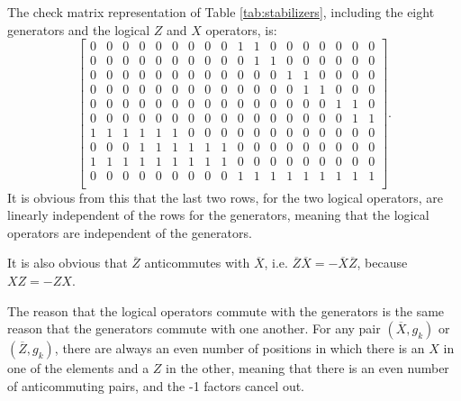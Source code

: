 \documentclass[12pt]{extarticle}
\begin{document}

The check matrix representation of Table \ref{tab:stabilizers}, including the eight generators and the logical $Z$ and $X$ operators, is:
\[
\left[
\begin{array}{ccccccccc|ccccccccc}
    0 & 0 & 0 & 0 & 0 & 0 & 0 & 0 & 0  &  1 & 1 & 0 & 0 & 0 & 0 & 0 & 0 & 0 \\
    0 & 0 & 0 & 0 & 0 & 0 & 0 & 0 & 0  &  0 & 1 & 1 & 0 & 0 & 0 & 0 & 0 & 0 \\
    0 & 0 & 0 & 0 & 0 & 0 & 0 & 0 & 0  &  0 & 0 & 0 & 1 & 1 & 0 & 0 & 0 & 0 \\
    0 & 0 & 0 & 0 & 0 & 0 & 0 & 0 & 0  &  0 & 0 & 0 & 0 & 1 & 1 & 0 & 0 & 0 \\
    0 & 0 & 0 & 0 & 0 & 0 & 0 & 0 & 0  &  0 & 0 & 0 & 0 & 0 & 0 & 1 & 1 & 0 \\
    0 & 0 & 0 & 0 & 0 & 0 & 0 & 0 & 0  &  0 & 0 & 0 & 0 & 0 & 0 & 0 & 1 & 1 \\
    1 & 1 & 1 & 1 & 1 & 1 & 0 & 0 & 0  &  0 & 0 & 0 & 0 & 0 & 0 & 0 & 0 & 0 \\
    0 & 0 & 0 & 1 & 1 & 1 & 1 & 1 & 1  &  0 & 0 & 0 & 0 & 0 & 0 & 0 & 0 & 0 \\
    1 & 1 & 1 & 1 & 1 & 1 & 1 & 1 & 1  &  0 & 0 & 0 & 0 & 0 & 0 & 0 & 0 & 0 \\
    0 & 0 & 0 & 0 & 0 & 0 & 0 & 0 & 0  &  1 & 1 & 1 & 1 & 1 & 1 & 1 & 1 & 1 \\
\end{array}
\right].
\]
It is obvious from this that the last two rows, for the two logical operators, are linearly independent of the rows for the generators,
meaning that the logical operators are independent of the generators.

It is also obvious that $\overline{Z}$ anticommutes with $\overline{X}$, i.e. $\overline{Z}\overline{X} = -\overline{X}\overline{Z}$,
because $XZ = -ZX$.

The reason that the logical operators commute with the generators is the same reason that the generators commute with one another.
For any pair $(\overline{X},g_k)$ or $(\overline{Z},g_k)$, there are always an even number of positions in which there is an $X$ in one of the elements and a $Z$ in the other,
meaning that there is an even number of anticommuting pairs, and the -1 factors cancel out.

\end{document}
